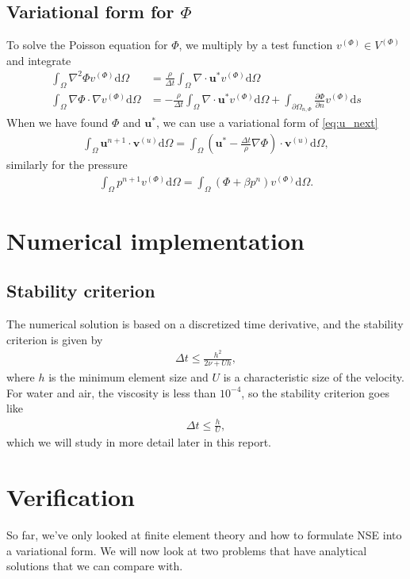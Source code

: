 \documentclass[a4paper,10pt]{article}
\renewcommand{\vec}[1]{\mathbf{#1}}
\renewcommand{\(}{\left(}
\renewcommand{\)}{\right)}
\newcommand{\dm}[1]{\text{d}#1}
\newcommand{\dpart}[2]{\frac{\partial#1}{\partial#2}}
\begin{document}
\subsection{Variational form for $\Phi$}
To solve the Poisson equation for $\Phi$, we multiply by a test function $v^{(\Phi)} \in V^{(\Phi)}$ and integrate
\begin{align*}
  \int_\Omega \nabla^2\Phi v^{(\Phi)} \dm \Omega &= \frac{\rho}{\Delta t} \int_\Omega \nabla \cdot \vec u^* v^{(\Phi)} \dm \Omega\\
  \int_\Omega \nabla\Phi \cdot \nabla v^{(\Phi)} \dm \Omega &= -\frac{\rho}{\Delta t} \int_\Omega \nabla \cdot \vec u^* v^{(\Phi)} \dm \Omega + \int_{\partial \Omega_{n,\Phi}} \dpart{\Phi}{n}v^{(\Phi)} \dm s
\end{align*}
When we have found $\Phi$ and $\vec u^*$, we can use a variational form of \eqref{eq:u_next}
\begin{align*}
  \int_\Omega \vec u^{n+1}\cdot \vec v^{(u)} \dm \Omega = \int_\Omega (\vec u^* - \frac{\Delta t}{\rho}\nabla \Phi)\cdot \vec v^{(u)} \dm \Omega,
\end{align*}
similarly for the pressure
\begin{align*}
  \int_\Omega p^{n+1}v^{(\Phi)} \dm \Omega = \int_\Omega (\Phi + \beta p^n)v^{(\Phi)} \dm \Omega.
\end{align*}
\section{Numerical implementation}
\subsection{Stability criterion}
The numerical solution is based on a discretized time derivative, and the stability criterion is given by \cite{ns_numerical_solutions}
\begin{align*}
  \Delta t \leq \frac{h^2}{2\nu + Uh},
\end{align*}
where $h$ is the minimum element size and $U$ is a characteristic size of the velocity. For water and air, the viscosity is less than $10^{-4}$, so the stability criterion goes like
\begin{align*}
  \Delta t \leq \frac{h}{U},
\end{align*}
which we will study in more detail later in this report.


\section{Verification}
So far, we've only looked at finite element theory and how to formulate NSE into a variational form. We will now look at two problems that have analytical solutions that we can compare with. 
\end{document}
